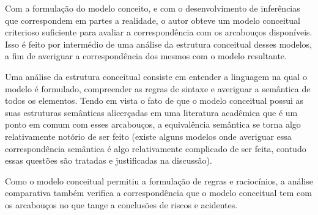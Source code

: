 Com a formulação do modelo conceito, e com o desenvolvimento de inferências que correspondem em partes a realidade, o autor obteve um modelo conceitual criterioso suficiente para avaliar a correspondência com os arcabouços disponíveis. Isso é feito por intermédio de uma análise da estrutura conceitual desses modelos, a fim de averiguar a correspondência dos mesmos com o modelo resultante.

Uma análise da estrutura conceitual consiste em entender a linguagem na qual o modelo é formulado, compreender as regras de sintaxe e averiguar a semântica de todos os elementos. Tendo em vista o fato de que o modelo conceitual possui as suas estruturas semânticas alicerçadas em uma literatura acadêmica que é um ponto em comum com esses arcabouços, a equivalência semântica se torna algo relativamente notório de ser feito (existe alguns modelos onde averiguar essa correspondência semântica é algo relativamente complicado de ser feita, contudo essas questões são tratadas e justificadas na discussão).

Como o modelo conceitual permitiu a formulação de regras e raciocínios, a análise comparativa também verifica a correspondência que o modelo conceitual tem com os arcabouços no que tange a conclusões de riscos e acidentes.